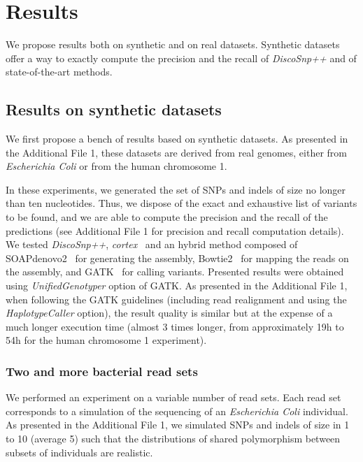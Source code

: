 \documentclass{bmcart}
\newcommand{\discopp}{{\it DiscoSnp++}\xspace}
\newcommand{\co}{{\it cortex}\xspace}
\begin{document}

\section*{Results}

We propose results both on synthetic and on real datasets. Synthetic datasets offer a way to exactly compute the precision and the recall of \discopp and of state-of-the-art methods. 

\subsection*{Results on synthetic datasets}
We first propose a bench of results based on synthetic datasets. As presented in the Additional File 1, these datasets are derived from real genomes, either from \emph{Escherichia Coli} or from the human chromosome 1. 

In these experiments, we generated the set of SNPs and indels of size no longer than ten nucleotides. 
Thus, we dispose of the exact and exhaustive list of variants to be found, and we are able to compute the precision and the recall of the predictions (see Additional File 1 for precision and recall computation details). We tested \discopp, \co~\cite{iqbal2012novo} and an hybrid method composed of SOAPdenovo2~\cite{luo2012soapdenovo2} for generating the assembly, Bowtie2~\cite{langmead2012fast} for mapping the reads on the assembly, and GATK~\cite{gatk} for calling variants. Presented results were obtained using \emph{UnifiedGenotyper} option of GATK. As presented in the Additional File 1, when following the GATK guidelines (including read realignment and using the \emph{HaplotypeCaller} option), the result quality is similar but at the expense of a much longer execution time (almost 3 times longer, from approximately 19h to 54h for the human chromosome 1 experiment). 

\subsubsection*{Two and more bacterial read sets}
We performed an experiment on a variable number of read sets. Each read set corresponds to a simulation of the sequencing of an \emph{Escherichia Coli} individual. As presented in the Additional File 1, we simulated SNPs and indels of size in 1 to 10 (average 5) such that the distributions of shared polymorphism between subsets of individuals are realistic. 
\end{document}
